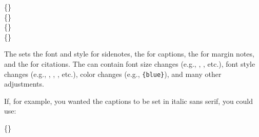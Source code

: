 \begin{docspec}
	\{\}\\
	\{\}\\
	\{\}\\
	\{\}
\end{docspec}

The  sets the font and style for sidenotes, the
 for captions, the  for
margin notes, and the  for citations.  The
 can contain font size changes (e.g.,
, , etc.), font style changes (e.g.,
, , , etc.), color changes (e.g.,
\texttt{\{blue\}}), and many other adjustments.

If, for example, you wanted the captions to be set in italic sans serif, you could use:
\begin{docspec}
	\{\}
\end{docspec}